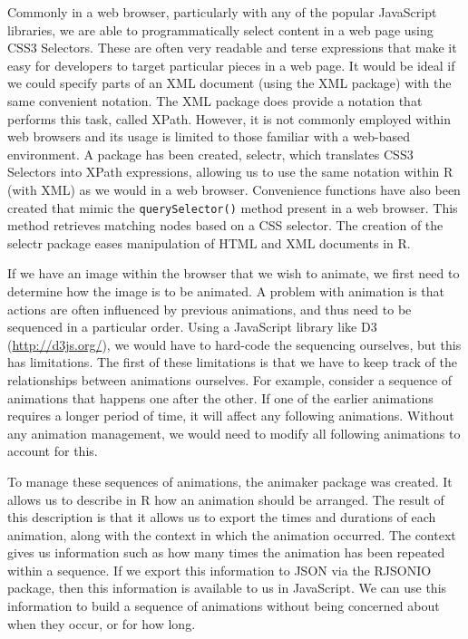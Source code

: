 \documentclass[11pt, a4paper]{article}
\newcommand{\R}{\textsf{R}}
\newcommand{\JS}{\textsf{JavaScript}}
\newcommand{\pkg}[1]{\textsf{#1}}
\newcommand{\code}[1]{\texttt{#1}}
\newcommand{\tsc}[1]{{\small \textsc{#1}}}
\begin{document}
Commonly in a web browser, particularly with any of the popular \JS{}
libraries, we are able to programmatically select content in a web
page using CSS3 Selectors. These are often very readable and terse
expressions that make it easy for developers to target particular
pieces in a web page. It would be ideal if we could specify parts of
an \tsc{XML} document (using the \pkg{XML} package) with the same
convenient notation. The \pkg{XML} package does provide a notation
that performs this task, called XPath. However, it is not commonly
employed within web browsers and its usage is limited to those
familiar with a web-based environment. A package has been created,
\pkg{selectr}, which translates CSS3 Selectors into XPath expressions,
allowing us to use the same notation within \R{} (with \pkg{XML}) as
we would in a web browser. Convenience functions have also been
created that mimic the \code{querySelector()} method present in a web
browser. This method retrieves matching nodes based on a CSS
selector. The creation of the \pkg{selectr} package eases manipulation
of \tsc{HTML} and \tsc{XML} documents in \R{}.

If we have an image within the browser that we wish to animate, we
first need to determine how the image is to be animated. A problem
with animation is that actions are often influenced by previous
animations, and thus need to be sequenced in a particular order. Using
a \JS{} library like D3 (\url{http://d3js.org/}), we would have to
hard-code the sequencing ourselves, but this has limitations. The
first of these limitations is that we have to keep track of the
relationships between animations ourselves. For example, consider a
sequence of animations that happens one after the other. If one of the
earlier animations requires a longer period of time, it will affect
any following animations. Without any animation management, we would
need to modify all following animations to account for this.

To manage these sequences of animations, the \pkg{animaker} package
was created. It allows us to describe in \R{} how an animation should
be arranged. The result of this description is that it allows us to
export the times and durations of each animation, along with the
context in which the animation occurred. The context gives us
information such as how many times the animation has been repeated
within a sequence. If we export this information to \tsc{JSON} via the
\pkg{RJSONIO} package, then this information is available to us in
\JS{}. We can use this information to build a sequence of animations
without being concerned about when they occur, or for how long.
\end{document}
